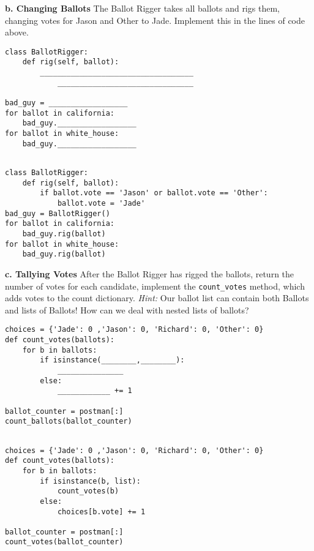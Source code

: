 \begin{blocksection}
\vspace{1\baselineskip}
\textbf{b. Changing Ballots}
The Ballot Rigger takes all ballots and rigs them, changing votes for Jason and Other to Jade. Implement this in the lines of code above.
\vspace{1\baselineskip}
\begin{lstlisting}
class BallotRigger:
    def rig(self, ballot):
        ___________________________________
        	_______________________________

bad_guy = __________________
for ballot in california:
    bad_guy.__________________
for ballot in white_house:
    bad_guy.__________________


\end{lstlisting}
\begin{solution}[1in]
\begin{lstlisting}
class BallotRigger:
    def rig(self, ballot):
        if ballot.vote == 'Jason' or ballot.vote == 'Other':
            ballot.vote = 'Jade'
bad_guy = BallotRigger()
for ballot in california:
    bad_guy.rig(ballot)
for ballot in white_house:
    bad_guy.rig(ballot)
\end{lstlisting}
\end{solution}
\vspace{1\baselineskip}
\textbf{c. Tallying Votes}
After the Ballot Rigger has rigged the ballots, return the number of votes for each candidate, implement the \lstinline{count_votes} method, which adds votes to the count dictionary. 
\emph{Hint:} Our ballot list can contain both Ballots and lists of Ballots! How can we deal with nested lists of ballots?
\vspace{1\baselineskip}
\begin{lstlisting}
choices = {'Jade': 0 ,'Jason': 0, 'Richard': 0, 'Other': 0}
def count_votes(ballots):
    for b in ballots:
        if isinstance(________,________):
            _______________
        else:
            ____________ += 1

ballot_counter = postman[:]
count_ballots(ballot_counter)


\end{lstlisting}
\begin{solution}[1in]
\begin{lstlisting}
choices = {'Jade': 0 ,'Jason': 0, 'Richard': 0, 'Other': 0}
def count_votes(ballots):
    for b in ballots:
        if isinstance(b, list):
            count_votes(b)
        else:
            choices[b.vote] += 1

ballot_counter = postman[:]
count_votes(ballot_counter)
\end{lstlisting}
\end{solution}
\end{blocksection}



